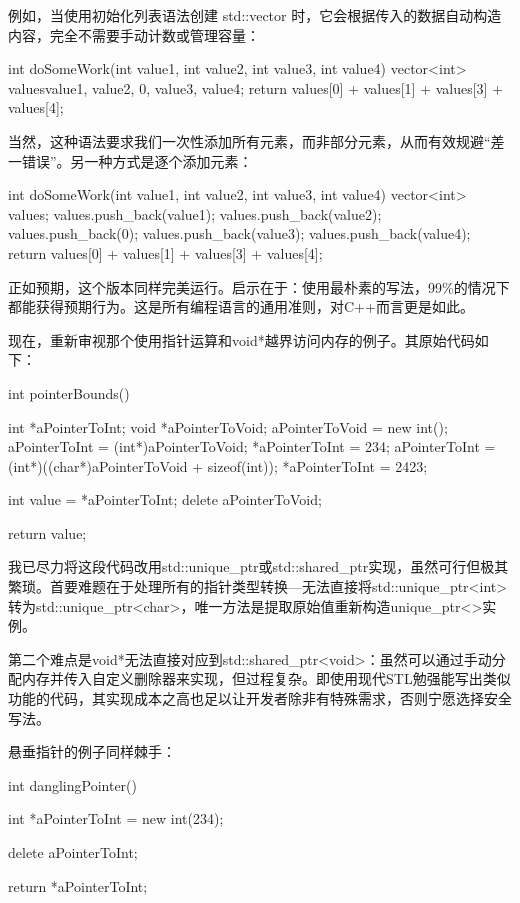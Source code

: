 例如，当使用初始化列表语法创建 std::vector 时，它会根据传入的数据自动构造内容，完全不需要手动计数或管理容量：

\begin{cpp}
int doSomeWork(int value1, int value2, int value3, int value4) {
  vector<int> values{value1, value2, 0, value3, value4};
  return values[0] + values[1] + values[3] + values[4];
}
\end{cpp}

当然，这种语法要求我们一次性添加所有元素，而非部分元素，从而有效规避“差一错误”。另一种方式是逐个添加元素：

\begin{cpp}
int doSomeWork(int value1, int value2, int value3, int value4) {
  vector<int> values;
  values.push_back(value1);
  values.push_back(value2);
  values.push_back(0);
  values.push_back(value3);
  values.push_back(value4);
  return values[0] + values[1] + values[3] + values[4];
}
\end{cpp}

正如预期，这个版本同样完美运行。启示在于：使用最朴素的写法，99\%的情况下都能获得预期行为。这是所有编程语言的通用准则，对C++而言更是如此。

现在，重新审视那个使用指针运算和void*越界访问内存的例子。其原始代码如下：

\begin{cpp}
int pointerBounds() {
  int *aPointerToInt;
  void *aPointerToVoid;
  aPointerToVoid = new int();
  aPointerToInt = (int*)aPointerToVoid;
  *aPointerToInt = 234;
  aPointerToInt = (int*)((char*)aPointerToVoid + sizeof(int));
  *aPointerToInt = 2423;

  int value = *aPointerToInt;
  delete aPointerToVoid;

  return value;
}
\end{cpp}

我已尽力将这段代码改用std::unique\_ptr或std::shared\_ptr实现，虽然可行但极其繁琐。首要难题在于处理所有的指针类型转换---无法直接将std::unique\_ptr<int>转为std::unique\_ptr<char>，唯一方法是提取原始值重新构造unique\_ptr<>实例。

第二个难点是void*无法直接对应到std::shared\_ptr<void>：虽然可以通过手动分配内存并传入自定义删除器来实现，但过程复杂。即使用现代STL勉强能写出类似功能的代码，其实现成本之高也足以让开发者除非有特殊需求，否则宁愿选择安全写法。

悬垂指针的例子同样棘手：

\begin{cpp}
int danglingPointer() {
  int *aPointerToInt = new int(234);

  delete aPointerToInt;

  return *aPointerToInt;
}
\end{cpp}


